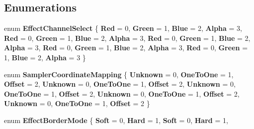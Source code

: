 \subsection*{Enumerations}
\begin{DoxyCompactItemize}
\item 
\mbox{\label{namespace_microsoft_1_1_graphics_1_1_canvas_1_1_effects_aa548de5fcafa34088d6dfff1bf77df8b}} 
enum {\bfseries Effect\+Channel\+Select} \{ \newline
{\bfseries Red} = 0, 
{\bfseries Green} = 1, 
{\bfseries Blue} = 2, 
{\bfseries Alpha} = 3, 
\newline
{\bfseries Red} = 0, 
{\bfseries Green} = 1, 
{\bfseries Blue} = 2, 
{\bfseries Alpha} = 3, 
\newline
{\bfseries Red} = 0, 
{\bfseries Green} = 1, 
{\bfseries Blue} = 2, 
{\bfseries Alpha} = 3, 
\newline
{\bfseries Red} = 0, 
{\bfseries Green} = 1, 
{\bfseries Blue} = 2, 
{\bfseries Alpha} = 3, 
\newline
{\bfseries Red} = 0, 
{\bfseries Green} = 1, 
{\bfseries Blue} = 2, 
{\bfseries Alpha} = 3
 \}
\item 
\mbox{\label{namespace_microsoft_1_1_graphics_1_1_canvas_1_1_effects_aee19f17bf119d8ef07f460eb2da92efe}} 
enum {\bfseries Sampler\+Coordinate\+Mapping} \{ \newline
{\bfseries Unknown} = 0, 
{\bfseries One\+To\+One} = 1, 
{\bfseries Offset} = 2, 
{\bfseries Unknown} = 0, 
\newline
{\bfseries One\+To\+One} = 1, 
{\bfseries Offset} = 2, 
{\bfseries Unknown} = 0, 
{\bfseries One\+To\+One} = 1, 
\newline
{\bfseries Offset} = 2, 
{\bfseries Unknown} = 0, 
{\bfseries One\+To\+One} = 1, 
{\bfseries Offset} = 2, 
\newline
{\bfseries Unknown} = 0, 
{\bfseries One\+To\+One} = 1, 
{\bfseries Offset} = 2
 \}
\item 
\mbox{\label{namespace_microsoft_1_1_graphics_1_1_canvas_1_1_effects_af071f1b230fa4fc760f6db8e5ad7d9db}} 
enum {\bfseries Effect\+Border\+Mode} \{ \newline
{\bfseries Soft} = 0, 
{\bfseries Hard} = 1, 
{\bfseries Soft} = 0, 
{\bfseries Hard} = 1, 

\end{DoxyCompactItemize}

